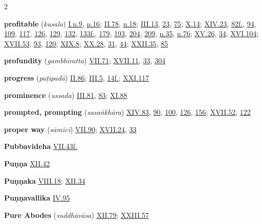 \begin{multicols}{2}
\begin{vismHanging}
\par\textbf{profitable} (\emph{kusala}) \hyperlink{I.n9}{I.n.9}{}, \hyperlink{I.n16}{n.16}{}; \hyperlink{II.78}{II.78}{}, \hyperlink{II.n18}{n.18}{}; \hyperlink{III.13}{III.13}{}, \hyperlink{III.23}{23}{}, \hyperlink{III.75}{75}{}; \hyperlink{X.14}{X.14}{}; \hyperlink{XIV.23}{XIV.23}{}, \hyperlink{XIV.82}{82f.}{}, \hyperlink{XIV.94}{94}{}, \hyperlink{XIV.109}{109}{}, \hyperlink{XIV.117}{117}{}, \hyperlink{XIV.126}{126}{}, \hyperlink{XIV.129}{129}{}, \hyperlink{XIV.132}{132}{}, \hyperlink{XIV.133}{133f.}{}, \hyperlink{XIV.179}{179}{}, \hyperlink{XIV.193}{193}{}, \hyperlink{XIV.204}{204}{}, \hyperlink{XIV.209}{209}{}, \hyperlink{XIV.n35}{n.35}{}, \hyperlink{XIV.n76}{n.76}{}; \hyperlink{XV.26}{XV.26}{}, \hyperlink{XV.34}{34}{}; \hyperlink{XVI.104}{XVI.104}{}; \hyperlink{XVII.53}{XVII.53}{}, \hyperlink{XVII.93}{93}{}, \hyperlink{XVII.120}{120}{}; \hyperlink{XIX.8}{XIX.8}{}; \hyperlink{XX.28}{XX.28}{}, \hyperlink{XX.31}{31}{}, \hyperlink{XX.44}{44}{}; \hyperlink{XXII.35}{XXII.35}{}, \hyperlink{XXII.85}{85}{}
\par\textbf{profundity} (\emph{gambhīratta}) \hyperlink{VII.71}{VII.71}{}; \hyperlink{XVII.11}{XVII.11}{}, \hyperlink{XVII.33}{33}{}, \hyperlink{XVII.304}{304}{}
\par\textbf{progress} (\emph{paṭipadā}) \hyperlink{II.86}{II.86}{}; \hyperlink{III.5}{III.5}{}, \hyperlink{III.14}{14f.}{}; \hyperlink{XXI.117}{XXI.117}{}
\par\textbf{prominence} (\emph{ussada}) \hyperlink{III.81}{III.81}{}, \hyperlink{III.83}{83}{}; \hyperlink{XI.88}{XI.88}{}
\par\textbf{prompted, prompting} (\emph{sasaṅkhāra}) \hyperlink{XIV.83}{XIV.83}{}, \hyperlink{XIV.90}{90}{}, \hyperlink{XIV.100}{100}{}, \hyperlink{XIV.126}{126}{}, \hyperlink{XIV.156}{156}{}; \hyperlink{XVII.52}{XVII.52}{}, \hyperlink{XVII.122}{122}{}
\par\textbf{proper way} (\emph{sāmīci}) \hyperlink{VII.90}{VII.90}{}; \hyperlink{XVII.24}{XVII.24}{}, \hyperlink{XVII.33}{33}{}
\par\textbf{Pubbavideha} \hyperlink{VII.43}{VII.43f.}{}
\par\textbf{Puṇṇa} \hyperlink{XII.42}{XII.42}{}
\par\textbf{Puṇṇaka} \hyperlink{VIII.18}{VIII.18}{}; \hyperlink{XII.34}{XII.34}{}
\par\textbf{Puṇṇavallika} \hyperlink{IV.95}{IV.95}{}
\par\textbf{Pure Abodes} (\emph{suddhāvāsa}) \hyperlink{XII.79}{XII.79}{}; \hyperlink{XXIII.57}{XXIII.57}{}

\end{vismHanging}
\end{multicols}
